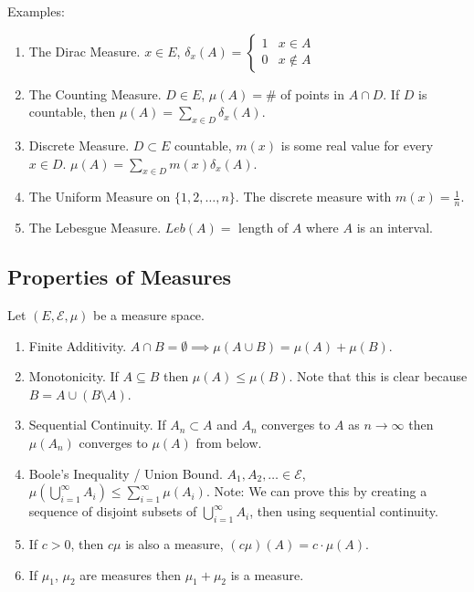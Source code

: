 \documentclass[english, course]{Notes}
\begin{document}
Examples:
\begin{enumerate}
	\item The Dirac Measure. $x \in E$, $\delta_x(A) =
	\begin{cases}
	1 & x \in A\\
	0 & x \not \in A
	\end{cases}$
	\item The Counting Measure. $D \in E$, $\mu(A) = $\# of points in $A \cap D$. If $D$ is countable, then $\mu(A) = \sum_{x \in D} \delta_x(A)$.
	\item Discrete Measure. $D \subset E$ countable, $m(x)$ is some real value for every $x \in D$. $\mu(A) = \sum_{x \in D} m(x)\delta_x(A)$.
	\item The Uniform Measure on $\{1, 2, \dots, n\}$. The discrete measure with $m(x) = \frac{1}{n}$.
	\item The Lebesgue Measure. $Leb(A) =$ length of $A$ where $A$ is an interval.
\end{enumerate}

\subsection{Properties of Measures}

Let $(E, \mathcal{E}, \mu)$ be a measure space.\\

\begin{enumerate}
	\item Finite Additivity. $A \cap B = \emptyset \implies \mu (A \cup B) = \mu(A) + \mu(B)$.
	\item  Monotonicity. If $A \subseteq B$ then $\mu(A) \leq \mu(B)$. Note that this is clear because $B = A \cup (B \setminus A)$.
	\item  Sequential Continuity. If $A_n \subset A$ and $A_n$ converges to $A$ as $n \to \infty$ then $\mu(A_n)$ converges to $\mu(A)$ from below.
	\item Boole's Inequality / Union Bound. $A_1, A_2, \dots \in \mathcal{E}$, $\mu(\bigcup^\infty_{i = 1} A_i) \leq \sum_{i = 1}^\infty \mu(A_i)$. Note: We can prove this by creating a sequence of disjoint subsets of $\bigcup_{i = 1}^\infty A_i$, then using sequential continuity.
	\item If $c > 0$, then $c\mu$ is also a measure, $(c\mu)(A) = c \cdot \mu(A)$.
	\item If $\mu_1$, $\mu_2$ are measures then $\mu_1 + \mu_2$ is a measure.
\end{enumerate}
\end{document}
